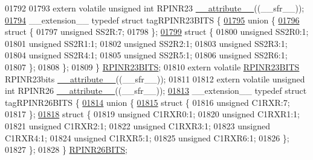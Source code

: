 \begin{DoxyCode}
01792 
01793 \textcolor{keyword}{extern} \textcolor{keyword}{volatile} \textcolor{keywordtype}{unsigned} \textcolor{keywordtype}{int}  RPINR23 \hyperlink{a00015_a493c46f03454991ccc5aa7a6e1dfb2a7}{\_\_attribute\_\_}((\_\_sfr\_\_));
\hypertarget{a00015_source_l01794}{}\hyperlink{a00014}{01794} \_\_extension\_\_ \textcolor{keyword}{typedef} \textcolor{keyword}{struct }tagRPINR23BITS \{
\hypertarget{a00015_source_l01795}{}\hyperlink{a00015}{01795}   \textcolor{keyword}{union }\{
\hypertarget{a00015_source_l01796}{}\hyperlink{a00015}{01796}     \textcolor{keyword}{struct }\{
01797       \textcolor{keywordtype}{unsigned} SS2R:7;
01798     \};
\hypertarget{a00015_source_l01799}{}\hyperlink{a00015}{01799}     \textcolor{keyword}{struct }\{
01800       \textcolor{keywordtype}{unsigned} SS2R0:1;
01801       \textcolor{keywordtype}{unsigned} SS2R1:1;
01802       \textcolor{keywordtype}{unsigned} SS2R2:1;
01803       \textcolor{keywordtype}{unsigned} SS2R3:1;
01804       \textcolor{keywordtype}{unsigned} SS2R4:1;
01805       \textcolor{keywordtype}{unsigned} SS2R5:1;
01806       \textcolor{keywordtype}{unsigned} SS2R6:1;
01807     \};
01808   \};
01809 \} \hyperlink{a00014_dd/dc1/a00721}{RPINR23BITS};
01810 \textcolor{keyword}{extern} \textcolor{keyword}{volatile} \hyperlink{a00014_dd/dc1/a00721}{RPINR23BITS} RPINR23bits \hyperlink{a00015_a493c46f03454991ccc5aa7a6e1dfb2a7}{\_\_attribute\_\_}((\_\_sfr\_\_));
01811 
01812 \textcolor{keyword}{extern} \textcolor{keyword}{volatile} \textcolor{keywordtype}{unsigned} \textcolor{keywordtype}{int}  RPINR26 \hyperlink{a00015_a493c46f03454991ccc5aa7a6e1dfb2a7}{\_\_attribute\_\_}((\_\_sfr\_\_));
\hypertarget{a00015_source_l01813}{}\hyperlink{a00014}{01813} \_\_extension\_\_ \textcolor{keyword}{typedef} \textcolor{keyword}{struct }tagRPINR26BITS \{
\hypertarget{a00015_source_l01814}{}\hyperlink{a00015}{01814}   \textcolor{keyword}{union }\{
\hypertarget{a00015_source_l01815}{}\hyperlink{a00015}{01815}     \textcolor{keyword}{struct }\{
01816       \textcolor{keywordtype}{unsigned} C1RXR:7;
01817     \};
\hypertarget{a00015_source_l01818}{}\hyperlink{a00015}{01818}     \textcolor{keyword}{struct }\{
01819       \textcolor{keywordtype}{unsigned} C1RXR0:1;
01820       \textcolor{keywordtype}{unsigned} C1RXR1:1;
01821       \textcolor{keywordtype}{unsigned} C1RXR2:1;
01822       \textcolor{keywordtype}{unsigned} C1RXR3:1;
01823       \textcolor{keywordtype}{unsigned} C1RXR4:1;
01824       \textcolor{keywordtype}{unsigned} C1RXR5:1;
01825       \textcolor{keywordtype}{unsigned} C1RXR6:1;
01826     \};
01827   \};
01828 \} \hyperlink{a00014_d0/d72/a00724}{RPINR26BITS};

\end{DoxyCode}
